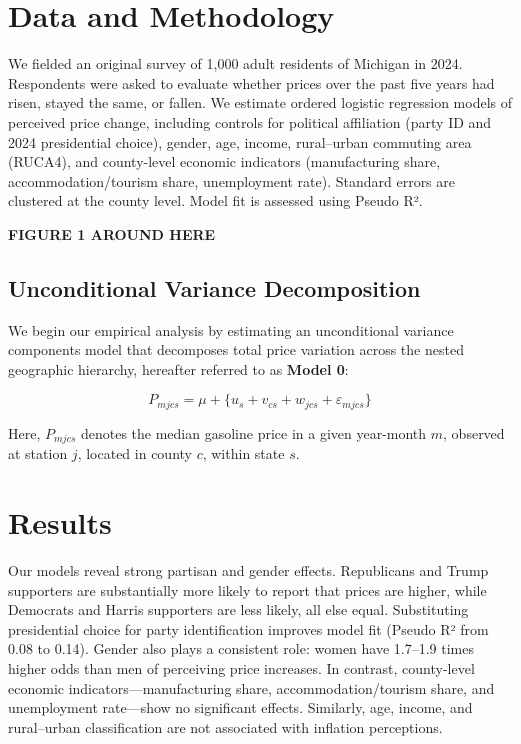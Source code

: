 \documentclass[preprint,12pt,authoryear]{elsarticle}
\begin{document}
\section{Data and Methodology}
We fielded an original survey of 1,000 adult residents of Michigan in 2024. Respondents were asked to evaluate whether prices over the past five years had risen, stayed the same, or fallen. We estimate ordered logistic regression models of perceived price change, including controls for political affiliation (party ID and 2024 presidential choice), gender, age, income, rural–urban commuting area (RUCA4), and county-level economic indicators (manufacturing share, accommodation/tourism share, unemployment rate). Standard errors are clustered at the county level. Model fit is assessed using Pseudo R².



\begin{center}
\textbf{FIGURE 1 AROUND HERE}
\end{center}


\subsection{Unconditional Variance Decomposition}

We begin our empirical analysis by estimating an unconditional variance components model that decomposes total price variation across the nested geographic hierarchy, hereafter referred to as \textbf{Model 0}:

\vspace{1em}


\begin{equation}
P_{mjcs} = \mu + \{u_s + v_{cs} + w_{jcs} + \varepsilon_{mjcs}\}
\label{eq:null_model}
\end{equation}

Here, \( P_{mjcs} \) denotes the median gasoline price in a given year-month \( m \), observed at station \( j \), located in county \( c \), within state \( s \). 

\section{Results}
Our models reveal strong partisan and gender effects. Republicans and Trump supporters are substantially more likely to report that prices are higher, while Democrats and Harris supporters are less likely, all else equal. Substituting presidential choice for party identification improves model fit (Pseudo R² from 0.08 to 0.14). Gender also plays a consistent role: women have 1.7–1.9 times higher odds than men of perceiving price increases. In contrast, county-level economic indicators—manufacturing share, accommodation/tourism share, and unemployment rate—show no significant effects. Similarly, age, income, and rural–urban classification are not associated with inflation perceptions.
\end{document}
